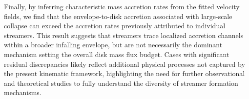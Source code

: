 Finally, by inferring characteristic mass accretion rates from the fitted velocity fields, we find that the envelope-to-disk accretion associated with large-scale collapse can exceed the accretion rates previously attributed to individual streamers. This result suggests that streamers trace localized accretion channels within a broader infalling envelope, but are not necessarily the dominant mechanism setting the overall disk mass flux budget. Cases with significant residual discrepancies likely reflect additional physical processes not captured by the present kinematic framework, highlighting the need for further observational and theoretical studies to fully understand the diversity of streamer formation mechanisms.